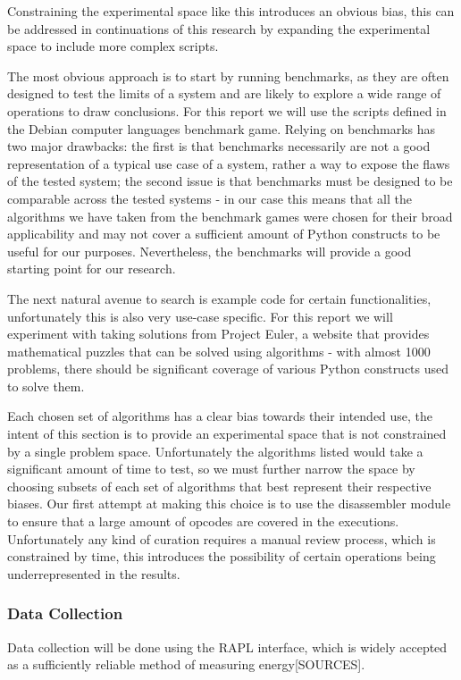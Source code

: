 Constraining the experimental space like this introduces an obvious bias, this can be addressed in continuations of this
research by expanding the experimental space to include more complex scripts.

The most obvious approach is to start by running benchmarks, as they are often designed to test the limits of a system
and are likely to explore a wide range of operations to draw conclusions.
For this report we will use the scripts defined in the Debian computer languages benchmark game\cite{BenchmarkGame}.
Relying on benchmarks has two major drawbacks: the first is that benchmarks necessarily are not a good representation
of a typical use case of a system, rather a way to expose the flaws of the tested system; the second issue is that
benchmarks must be designed to be comparable across the tested systems - in our case this means that all the algorithms
we have taken from the benchmark games were chosen for their broad applicability and may not cover a sufficient amount
of Python constructs to be useful for our purposes.
Nevertheless, the benchmarks will provide a good starting point for our research.

The next natural avenue to search is example code for certain functionalities, unfortunately this is also very use-case
specific.
For this report we will experiment with taking solutions from Project Euler\cite{ProjectEuler}, a website that provides
mathematical puzzles that can be solved using algorithms - with almost 1000 problems, there should be significant
coverage of various Python constructs used to solve them.

Each chosen set of algorithms has a clear bias towards their intended use, the intent of this section is to provide an
experimental space that is not constrained by a single problem space.
Unfortunately the algorithms listed would take a significant amount of time to test, so we must further narrow the space
by choosing subsets of each set of algorithms that best represent their respective biases.
Our first attempt at making this choice is to use the disassembler module to ensure that a large amount of opcodes are
covered in the executions.
Unfortunately any kind of curation requires a manual review process, which is constrained by time, this introduces the
possibility of certain operations being underrepresented in the results.

\subsubsection{Data Collection}
Data collection will be done using the RAPL interface, which is widely accepted as a sufficiently reliable method of
measuring energy[SOURCES].

